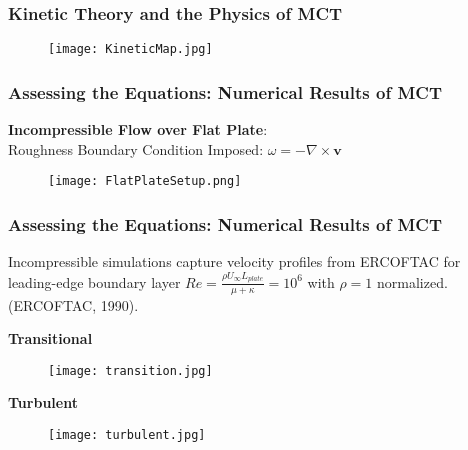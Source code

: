 \documentclass{beamer}
\begin{document}
\begin{frame}
 \frametitle{Kinetic Theory and the Physics of MCT}
 \begin{figure}
  \texttt{[image: KineticMap.jpg]}
 \end{figure}

\end{frame}

\begin{frame}
 \frametitle{Assessing the Equations: Numerical Results of MCT}
 \textbf{Incompressible Flow over Flat Plate}: \\
 Roughness Boundary Condition Imposed: $\omega = -\nabla \times \textbf{v}$
 \begin{figure}
  \texttt{[image: FlatPlateSetup.png]}
 \end{figure}
\end{frame}
\begin{frame}
 \frametitle{Assessing the Equations: Numerical Results of MCT}
 \small
 Incompressible simulations capture velocity profiles from ERCOFTAC for 
leading-edge boundary layer $Re = \frac{\rho U_{\infty}L_{plate}}{\mu + 
\kappa} = 10^6$ with $\rho = 1$ normalized. \\ (ERCOFTAC, 1990).
 \begin{multicols}{2}
 \centering
 \textbf{Transitional}
  \begin{figure}
   \texttt{[image: transition.jpg]}
  \end{figure}
  \centering
  \textbf{Turbulent}
\begin{figure}
 \texttt{[image: turbulent.jpg]}
 \end{figure}
 \end{multicols}
\end{frame}
\end{document}
